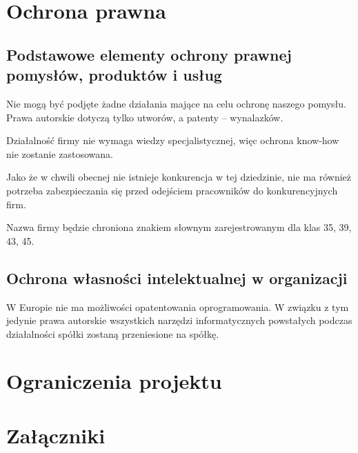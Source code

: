 \documentclass{article}
\begin{document}
\section{Ochrona prawna}
\subsection{Podstawowe elementy ochrony prawnej pomysłów, produktów i usług}
Nie mogą być podjęte żadne działania mające na celu ochronę naszego pomysłu. Prawa autorskie dotyczą tylko utworów, a patenty -- wynalazków. 

Działalność firmy nie wymaga wiedzy specjalistycznej, więc ochrona know-how nie zostanie zastosowana.

Jako że w chwili obecnej nie istnieje konkurencja w tej dziedzinie, nie ma również potrzeba zabezpieczania się przed odejściem pracowników do konkurencyjnych firm.

Nazwa firmy będzie chroniona znakiem słownym zarejestrowanym dla klas 35, 39, 43, 45.
\subsection{Ochrona własności intelektualnej w organizacji}
W Europie nie ma możliwości opatentowania oprogramowania. W związku z tym jedynie prawa autorskie wszystkich narzędzi informatycznych powstałych podczas działalności spółki zostaną przeniesione na spółkę.

\section{Ograniczenia projektu}


\section{Załączniki}
\end{document}
